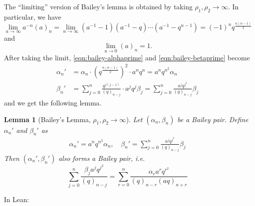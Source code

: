 \documentclass[12pt]{amsart}
\newtheorem{lemma}[theorem]{Lemma}
\theoremstyle{definition}
\theoremstyle{remark}
\numberwithin{equation}{subsection}
\begin{document}
The ``limiting'' version of Bailey's lemma is obtained by taking $\rho_1, \rho_2 \to \infty$. In particular, we have
\begin{equation}
    \lim_{a \to \infty} a^{-n} (a)_n = \lim_{n \to \infty} (a^{-1} - 1) (a^{-1} - q) \cdots (a^{-1} - q^{n-1}) = (-1)^{n} q^{\frac{n(n-1)}{2}}
\end{equation}
and
\begin{equation}
    \lim_{a \to 0} (a)_n = 1.
\end{equation}
After taking the limit, \eqref{eqn:bailey-alphaprime} and \eqref{eqn:bailey-betaprime} become
\begin{align}
    \alpha_n' &= \alpha_n \cdot (q^{\frac{n(n-1)}{2}})^2 \cdot a^n q^n = a^n q^{n^2} \alpha_n \\
    \beta_n' &= \sum_{j=0}^{n} \frac{q^{j(j-1)}}{(q)_{n-j}} \cdot a^j q^j\beta_j = \sum_{j=0}^{n} \frac{a^j q^{j^2}}{(q)_{n-j}} \beta_j
\end{align}
and we get the following lemma.
\begin{lemma}[Bailey's Lemma, $\rho_1, \rho_2 \to \infty$]
    \label{lem:bailey-limit-1}
    Let $(\alpha_n, \beta_n)$ be a Bailey pair.
    Define $\alpha_n'$ and $\beta_n'$ as
    \begin{align}
        \alpha_n' = a^n q^{n^2} \alpha_n, \quad \beta_n' = \sum_{j=0}^{n} \frac{a^j q^{j^2}}{(q)_{n-j}} \beta_j
    \end{align}
    Then $(\alpha_n', \beta_n')$ also forms a Bailey pair, i.e.
    \begin{equation}
    \label{eqn:bailey-limit-1}
        \sum_{j=0}^{n} \frac{\beta_j a^j q^{j^2}}{(q)_{n-j}} = \sum_{r=0}^{n} \frac{\alpha_r a^r q^{r^2}}{(q)_{n-r}(aq)_{n+r}} 
    \end{equation}
\end{lemma}

In Lean:
\end{document}
